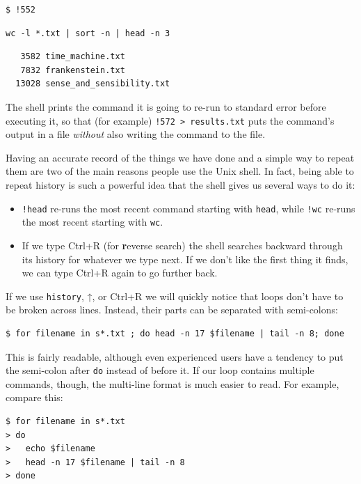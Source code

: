\documentclass[
]{krantz}
\providecommand{\tightlist}{%
  \setlength{\itemsep}{0pt}\setlength{\parskip}{0pt}}
\begin{document}
\begin{verbatim}
$ !552
\end{verbatim}

\begin{verbatim}
wc -l *.txt | sort -n | head -n 3
\end{verbatim}

\begin{verbatim}
   3582 time_machine.txt
   7832 frankenstein.txt
  13028 sense_and_sensibility.txt
\end{verbatim}

The shell prints the command it is going to re-run to standard error
before executing it,
so that (for example) \texttt{!572~\textgreater{}~results.txt}
puts the command's output in a file
\emph{without} also writing the command to the file.

Having an accurate record of the things we have done
and a simple way to repeat them
are two of the main reasons people use the Unix shell.
In fact,
being able to repeat history is such a powerful idea
that the shell gives us several ways to do it:

\begin{itemize}
\tightlist
\item
  \texttt{!head} re-runs the most recent command starting with \texttt{head},
  while \texttt{!wc} re-runs the most recent starting with \texttt{wc}.
\item
  If we type Ctrl+R (for \textbf{r}everse search)
  the shell searches backward through its history for whatever we type next.
  If we don't like the first thing it finds,
  we can type Ctrl+R again to go further back.
\end{itemize}

If we use \texttt{history}, ↑, or Ctrl+R
we will quickly notice that loops don't have to be broken across lines.
Instead,
their parts can be separated with semi-colons:

\begin{verbatim}
$ for filename in s*.txt ; do head -n 17 $filename | tail -n 8; done
\end{verbatim}

This is fairly readable,
although even experienced users have a tendency to put the semi-colon after \texttt{do} instead of before it.
If our loop contains multiple commands,
though,
the multi-line format is much easier to read.
For example,
compare this:

\begin{verbatim}
$ for filename in s*.txt
> do
>   echo $filename
>   head -n 17 $filename | tail -n 8
> done
\end{verbatim}
\end{document}

